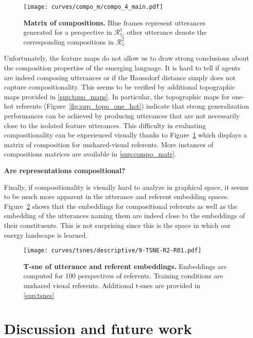 \begin{figure}[!h]
\centering
\texttt{[image: curves/compo\_m/compo\_4\_main.pdf]}
\caption{\textbf{Matrix of compositions. }Blue frames represent utterances generated for a perspective in $\mathcal{R}_5^1$, other utterance denote the corresponding compositions in $\mathcal{R}_5^2$ }
\label{fig:compo_matrix}
\end{figure}
%
Unfortunately, the feature maps do not allow us to draw strong conclusions about the composition properties of the emerging language. It is hard to tell if agents are indeed composing utterances or if the Haussdorf distance simply does not capture compositionality. This seems to be verified by additional topographic maps provided in \ap\ref{sup:topo_maps}. In particular, the topographic maps for one-hot referents (Figure~\ref{fig:sup_topo_one_hot}) indicate that strong generalization performances can be achieved by producing utterances that are not necessarily close to the isolated feature utterances. This difficulty in evaluating compositionality can be experienced visually thanks to Figure~\ref{fig:compo_matrix} which displays a matrix of composition for unshared-visual referents. More instances of compositions matrices are available in \ap\ref{sup:compo_matr}.


\vspace{.75cm}
\textbf{Are representations compositional?} 

Finally, if compositionality is visually hard to analyze in graphical space, it seems to be much more apparent in the utterance and referent embedding spaces. Figure~\ref{fig:tsne} shows that the embeddings for compositional referents as well as the embedding of the utterances naming them are indeed close to the embeddings of their constituents. This is not surprising since this is the space in which our energy landscape is learned. 



\begin{figure}[!h]
    \centering
    \texttt{[image: curves/tsnes/descriptive/9-TSNE-R2-R01.pdf]}
    \caption{\textbf{T-sne of utterance and referent embeddings. }Embeddings are computed for 100 perspectives of referents. Training conditions are unshared visual referents. Additional t-snes are provided in \ap\ref{sup:tsnes}}
    \label{fig:tsne}
\end{figure}
\section{Discussion and future work}

